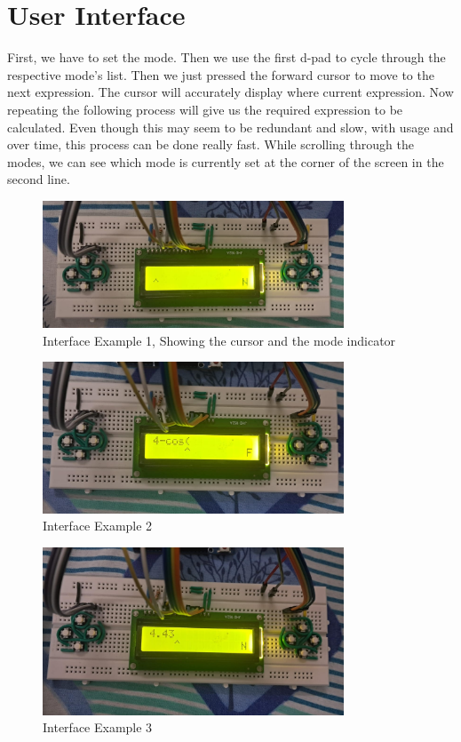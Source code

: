 \documentclass[journal]{IEEEtran}
\begin{document}
	\section{User Interface}
	First, we have to set the mode. Then we use the first d-pad to cycle through the respective mode's list. Then we just pressed the forward cursor to move to the next expression. The cursor will accurately display where current expression. Now repeating the following process will give us the required expression to be calculated. Even though this may seem to be redundant and slow, with usage and over time, this process can be done really fast. While scrolling through the modes, we can see which mode is currently set at the corner of the screen in the second line.
		\begin{figure}[h!]
		\centering
		\includegraphics[width=0.8\textwidth]{figs/inter.jpeg}
		\caption{Interface Example 1, Showing the cursor and the mode indicator}
	\end{figure}
			\begin{figure}[h!]
		\centering
		\includegraphics[width=0.8\textwidth]{figs/inter1.jpeg}
		\caption{Interface Example 2}
	\end{figure}
			\begin{figure}[h!]
		\centering
		\includegraphics[width=0.8\textwidth]{figs/inter2.jpeg}
		\caption{Interface Example 3}
	\end{figure}
\end{document}
